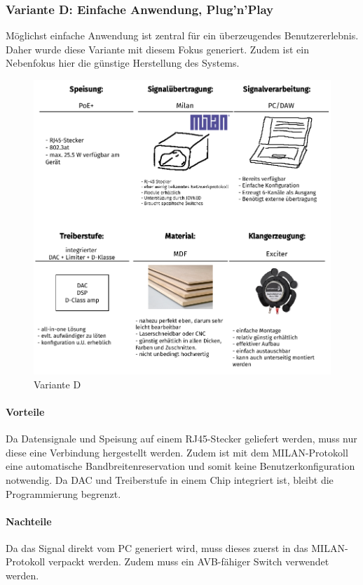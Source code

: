 \subsubsection{Variante D: Einfache Anwendung, Plug'n'Play}
Möglichst einfache Anwendung ist zentral für ein überzeugendes Benutzererlebnis. Daher wurde diese Variante mit diesem Fokus generiert. Zudem ist ein Nebenfokus hier die günstige Herstellung des Systems.
\begin{figure}[H]
	\centering
	\includegraphics{pictures/VarianteD_EinfachPlugnPlay.pdf}
	\caption{Variante D}
\end{figure}
\paragraph{Vorteile} Da Datensignale und Speisung auf einem RJ45-Stecker geliefert werden, muss nur diese eine Verbindung hergestellt werden. Zudem ist mit dem MILAN-Protokoll eine automatische Bandbreitenreservation und somit keine Benutzerkonfiguration notwendig. Da DAC und Treiberstufe in einem Chip integriert ist, bleibt die Programmierung begrenzt. 
\paragraph{Nachteile} Da das Signal direkt vom PC generiert wird, muss dieses zuerst in das MILAN-Protokoll verpackt werden. Zudem muss ein AVB-fähiger Switch verwendet werden.
\newpage

